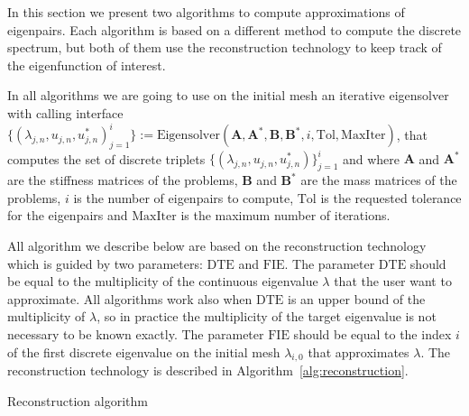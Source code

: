 \documentclass[preprint,12pt]{elsarticle}
\begin{document}
In this section we present two algorithms to compute approximations of eigenpairs. Each algorithm is based on a different method to compute the discrete spectrum, but both of them use the reconstruction technology to keep track of the eigenfunction of interest.

In all algorithms we are going to use on the initial mesh an iterative eigensolver with calling interface
$\{(\lambda_{j,n},u_{j,n},u_{j,n}^*)_{j=1}^{i}\}:=\mathrm{Eigensolver}(\mathbf{A},
\mathbf{A}^*,\mathbf{B},\mathbf{B}^*,i,\mathrm{Tol},\mathrm{MaxIter})$, that computes the set of discrete triplets $\{(\lambda_{j,n},u_{j,n},u_{j,n}^*)\}_{j=1}^{i}$ and where $\mathbf{A}$ and $\mathbf{A}^*$ are the stiffness matrices of the problems, $\mathbf{B}$ and $\mathbf{B}^*$ are the mass matrices of the problems, $i$ is the number of eigenpairs to compute, $\mathrm{Tol}$ is the requested tolerance for the eigenpairs and $\mathrm{MaxIter}$ is the maximum number of iterations. 


All algorithm we describe below are based on the reconstruction technology which is guided by two parameters: $\mathrm{DTE}$ and $\mathrm{FIE}$. The parameter $\mathrm{DTE}$ should be equal to the multiplicity of the continuous eigenvalue $\lambda$ that the user want to approximate. All algorithms work also when $\mathrm{DTE}$ is an upper bound of the multiplicity of $\lambda$, so in practice the multiplicity of the target eigenvalue is not necessary to be known exactly. The parameter $\mathrm{FIE}$ should be equal to the index $i$ of the first discrete eigenvalue on the initial mesh $\lambda_{i,0}$ that approximates $\lambda$. The reconstruction technology is described in Algorithm~\eqref{alg:reconstruction}.

\begin{algorithm}[H] \caption{Reconstruction algorithm} \label{alg:reconstruction} 
\begin{algorithmic}





\end{algorithmic}
\end{algorithm}
\end{document}
